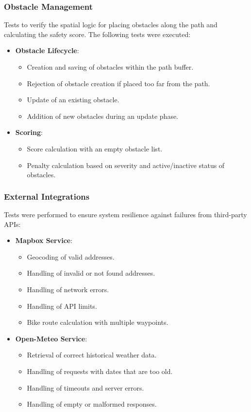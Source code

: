 \subsubsection{Obstacle Management}
Tests to verify the spatial logic for placing obstacles along the path and calculating the safety score. The following tests were executed:

\begin{itemize}
    \item \textbf{Obstacle Lifecycle}:
    \begin{itemize}
        \item Creation and saving of obstacles within the path buffer.
        \item Rejection of obstacle creation if placed too far from the path.
        \item Update of an existing obstacle.
        \item Addition of new obstacles during an update phase.
    \end{itemize}
    
    \item \textbf{Scoring}:
    \begin{itemize}
        \item Score calculation with an empty obstacle list.
        \item Penalty calculation based on severity and active/inactive status of obstacles.
    \end{itemize}
\end{itemize}

\subsubsection{External Integrations}
Tests were performed to ensure system resilience against failures from third-party APIs:

\begin{itemize}
    \item \textbf{Mapbox Service}:
    \begin{itemize}
        \item Geocoding of valid addresses.
        \item Handling of invalid or not found addresses.
        \item Handling of network errors.
        \item Handling of API limits.
        \item Bike route calculation with multiple waypoints.
    \end{itemize}
    
    \item \textbf{Open-Meteo Service}:
    \begin{itemize}
        \item Retrieval of correct historical weather data.
        \item Handling of requests with dates that are too old.
        \item Handling of timeouts and server errors.
        \item Handling of empty or malformed responses.
    \end{itemize}
\end{itemize}